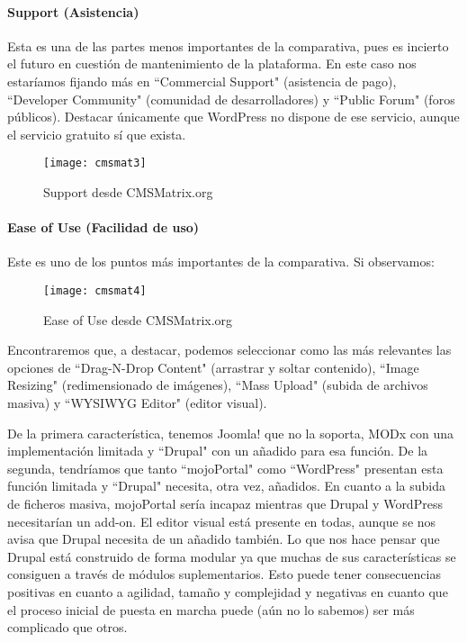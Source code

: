 \paragraph{Support (Asistencia)}

\par Esta es una de las partes menos importantes de la comparativa, pues es incierto el futuro en cuestión de mantenimiento de la plataforma. En este caso nos estaríamos fijando más en ``Commercial Support" (asistencia de pago), ``Developer Community" (comunidad de desarrolladores) y ``Public Forum" (foros públicos). Destacar únicamente que WordPress no dispone de ese servicio, aunque el servicio gratuito sí que exista.

\begin{figure}
\begin{narrow}{-0.15\linewidth}{-0.15\linewidth}
\centering
\texttt{[image: cmsmat3]}
\caption{Support desde CMSMatrix.org}
\end{narrow}
\label{fig:cmsmat3}
\end{figure}

\paragraph{Ease of Use (Facilidad de uso)}

\par Este es uno de los puntos más importantes de la comparativa. Si observamos:

\begin{figure}
\begin{narrow}{-0.15\linewidth}{-0.15\linewidth}
\centering
\texttt{[image: cmsmat4]}
\caption{Ease of Use desde CMSMatrix.org}
\end{narrow}
\label{fig:cmsmat4}
\end{figure}

\par Encontraremos que, a destacar, podemos seleccionar como las más relevantes las opciones de ``Drag-N-Drop Content" (arrastrar y soltar contenido), ``Image Resizing" (redimensionado de imágenes), ``Mass Upload" (subida de archivos masiva) y ``WYSIWYG Editor" (editor visual).
\par De la primera característica, tenemos Joomla! que no la soporta, MODx con una implementación limitada y ``Drupal" con un añadido para esa función. De la segunda, tendríamos que tanto ``mojoPortal" como ``WordPress" presentan esta función limitada y ``Drupal" necesita, otra vez, añadidos. En cuanto a la subida de ficheros masiva, mojoPortal sería incapaz mientras que Drupal y WordPress necesitarían un add-on. El editor visual está presente en todas, aunque se nos avisa que Drupal necesita de un añadido también. Lo que nos hace pensar que Drupal está construido de forma modular ya que muchas de sus características se consiguen a través de módulos suplementarios. Esto puede tener consecuencias positivas en cuanto a agilidad, tamaño y complejidad y negativas en cuanto que el proceso inicial de puesta en marcha puede (aún no lo sabemos) ser más complicado que otros.



